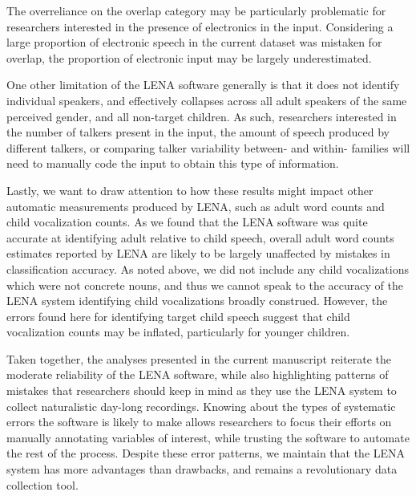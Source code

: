 \documentclass[man,floatsintext]{apa6}
\theoremstyle{definition}
\theoremstyle{definition}
\theoremstyle{definition}
\theoremstyle{remark}
\begin{document}
The overreliance on the overlap category may be particularly problematic
for researchers interested in the presence of electronics in the input.
Considering a large proportion of electronic speech in the current
dataset was mistaken for overlap, the proportion of electronic input may
be largely underestimated.

One other limitation of the LENA software generally is that it does not
identify individual speakers, and effectively collapses across all adult
speakers of the same perceived gender, and all non-target children. As
such, researchers interested in the number of talkers present in the
input, the amount of speech produced by different talkers, or comparing
talker variability between- and within- families will need to manually
code the input to obtain this type of information.

Lastly, we want to draw attention to how these results might impact
other automatic measurements produced by LENA, such as adult word counts
and child vocalization counts. As we found that the LENA software was
quite accurate at identifying adult relative to child speech, overall
adult word counts estimates reported by LENA are likely to be largely
unaffected by mistakes in classification accuracy. As noted above, we
did not include any child vocalizations which were not concrete nouns,
and thus we cannot speak to the accuracy of the LENA system identifying
child vocalizations broadly construed. However, the errors found here
for identifying target child speech suggest that child vocalization
counts may be inflated, particularly for younger children.

Taken together, the analyses presented in the current manuscript
reiterate the moderate reliability of the LENA software, while also
highlighting patterns of mistakes that researchers should keep in mind
as they use the LENA system to collect naturalistic day-long recordings.
Knowing about the types of systematic errors the software is likely to
make allows researchers to focus their efforts on manually annotating
variables of interest, while trusting the software to automate the rest
of the process. Despite these error patterns, we maintain that the LENA
system has more advantages than drawbacks, and remains a revolutionary
data collection tool.

\newpage

\begingroup
\setlength{\parindent}{-0.5in}
\setlength{\leftskip}{0.5in}

\hypertarget{refs}{}

\endgroup


\end{document}
